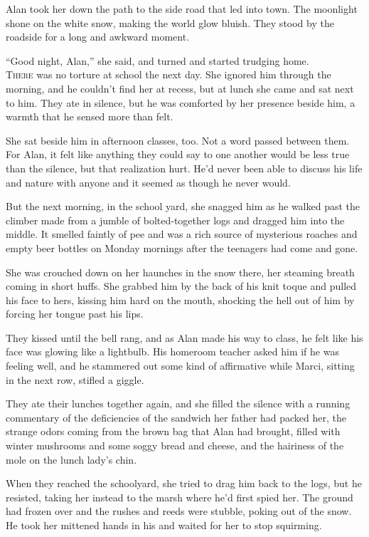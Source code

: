 Alan took her down the path to the side road that led into town.  The
moonlight shone on the white snow, making the world glow bluish.  They
stood by the roadside for a long and awkward moment.

``Good night, Alan,'' she said, and turned and started trudging home.
\\
\lettrine[lines=3, lhang=.5, nindent=0pt, findent=2pt]{T}{here} was no torture at school the next day.  She ignored him through
the morning, and he couldn't find her at recess, but at lunch she came
and sat next to him.  They ate in silence, but he was comforted by her
presence beside him, a warmth that he sensed more than felt.

She sat beside him in afternoon classes, too.  Not a word passed
between them.  For Alan, it felt like anything they could say to one
another would be less true than the silence, but that realization
hurt.  He'd never been able to discuss his life and nature with anyone
and it seemed as though he never would.

But the next morning, in the school yard, she snagged him as he walked
past the climber made from a jumble of bolted-together logs and
dragged him into the middle.  It smelled faintly of pee and was a rich
source of mysterious roaches and empty beer bottles on Monday mornings
after the teenagers had come and gone.

She was crouched down on her haunches in the snow there, her steaming
breath coming in short huffs.  She grabbed him by the back of his knit
toque and pulled his face to hers, kissing him hard on the mouth,
shocking the hell out of him by forcing her tongue past his lips.

They kissed until the bell rang, and as Alan made his way to class, he
felt like his face was glowing like a lightbulb.  His homeroom teacher
asked him if he was feeling well, and he stammered out some kind of
affirmative while Marci, sitting in the next row, stifled a giggle.

They ate their lunches together again, and she filled the silence with
a running commentary of the deficiencies of the sandwich her father
had packed her, the strange odors coming from the brown bag that Alan
had brought, filled with winter mushrooms and some soggy bread and
cheese, and the hairiness of the mole on the lunch lady's chin.

When they reached the schoolyard, she tried to drag him back to the
logs, but he resisted, taking her instead to the marsh where he'd
first spied her.  The ground had frozen over and the rushes and reeds
were stubble, poking out of the snow.  He took her mittened hands in
his and waited for her to stop squirming.

